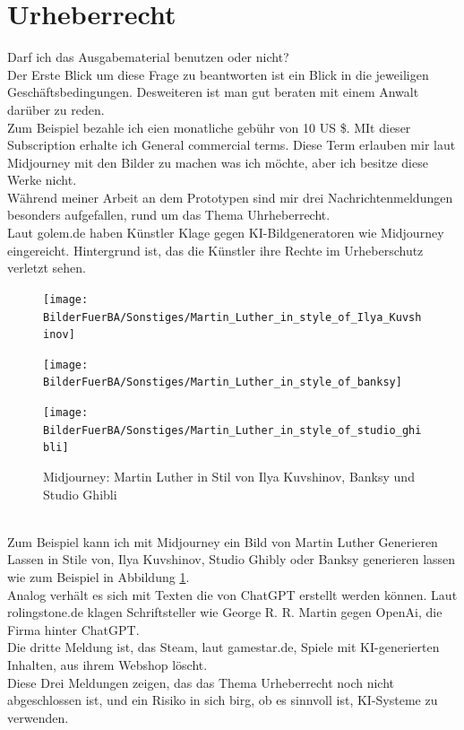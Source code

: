 \section{Urheberrecht}
Darf ich das Ausgabematerial benutzen oder nicht? 
\\
Der Erste Blick um diese Frage zu beantworten ist ein Blick in die jeweiligen Geschäftsbedingungen. Desweiteren ist man gut beraten mit einem Anwalt darüber zu reden.
\\
Zum Beispiel bezahle ich eien monatliche gebühr von 10 US \$. MIt dieser Subscription erhalte ich General commercial terms. Diese Term erlauben mir laut Midjourney mit den Bilder zu machen was ich möchte, aber ich besitze diese Werke nicht.
\\
Während meiner Arbeit an dem Prototypen sind mir drei Nachrichtenmeldungen besonders aufgefallen, rund um das Thema Uhrheberrecht.
\\
Laut golem.de haben Künstler Klage gegen KI-Bildgeneratoren wie Midjourney eingereicht. Hintergrund ist, das die Künstler ihre Rechte im Urheberschutz verletzt sehen.
\begin{figure}
	\centering
	\begin{minipage}[t]{0\linewidth}
		\centering
		\texttt{[image: BilderFuerBA/Sonstiges/Martin\_Luther\_in\_style\_of\_Ilya\_Kuvshinov]}
	\end{minipage}
	\hfill
	\begin{minipage}[t]{0.3855\linewidth}
		\centering
		\texttt{[image: BilderFuerBA/Sonstiges/Martin\_Luther\_in\_style\_of\_banksy]}
	\end{minipage}
	\begin{minipage}[t]{0.3\linewidth}
		\centering
		\texttt{[image: BilderFuerBA/Sonstiges/Martin\_Luther\_in\_style\_of\_studio\_ghibli]}
	\end{minipage}
	\caption{Midjourney: Martin Luther in Stil von Ilya Kuvshinov, Banksy und Studio Ghibli}
	\label{MLinDreiStilen}
\end{figure}
\\
Zum Beispiel kann ich mit Midjourney ein Bild von Martin Luther Generieren Lassen in Stile von, Ilya Kuvshinov, Studio Ghibly oder Banksy generieren lassen wie zum Beispiel in Abbildung \ref{MLinDreiStilen}.
\\
Analog verhält es sich mit Texten die von ChatGPT erstellt werden können. Laut rolingstone.de klagen Schriftsteller wie George R. R. Martin gegen OpenAi, die Firma hinter ChatGPT.
\\
Die dritte Meldung ist, das Steam, laut gamestar.de, Spiele mit KI-generierten Inhalten, aus ihrem Webshop löscht.
\\
Diese Drei Meldungen zeigen, das das Thema Urheberrecht noch nicht abgeschlossen ist, und ein Risiko in sich birg, ob es sinnvoll ist, KI-Systeme zu verwenden.

